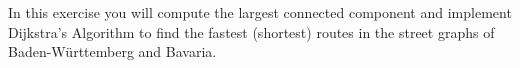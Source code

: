 In this exercise you will compute the largest connected component and implement 
Dijkstra's Algorithm to find the fastest (shortest) routes in the street graphs 
of Baden-Württemberg and Bavaria.
